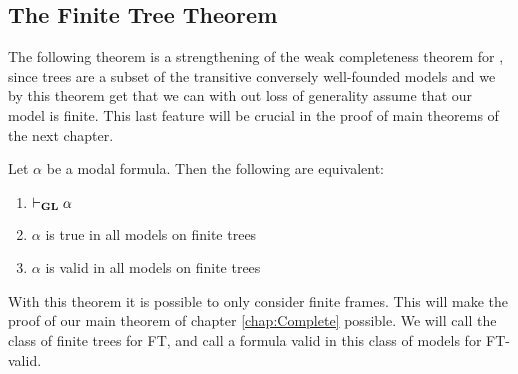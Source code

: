\documentclass[../main.tex]{subfiles}
\begin{document}
\subsection{The Finite Tree Theorem}
The following theorem is a strengthening of the weak completeness theorem for
\GL, since trees are a subset of the transitive conversely well-founded models
and we by this theorem get that we can with out loss of generality assume that
our model is finite. This last feature will be crucial in the proof of main
theorems of the next chapter.
\begin{thm}
	Let $\alpha$ be a modal formula. Then the following are equivalent:
	\begin{enumerate}
		\item $\vdash_{\text{\textbf{GL}}}\alpha$
		\item $\alpha$ is true in all models on finite trees
		\item $\alpha$ is valid in all models on finite trees
	\end{enumerate}
\end{thm}
With this theorem it is possible to only consider finite frames. This will make
the proof of our main theorem of chapter \ref{chap:Complete} possible. We will
call the class of finite trees for FT, and call a formula valid in this class
of models for FT-valid.
\end{document}
